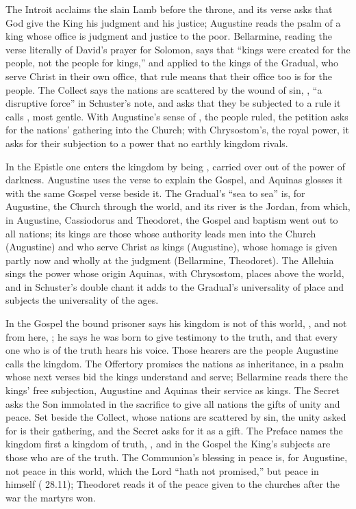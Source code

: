 The Introit acclaims the slain Lamb before the throne, and its verse asks that
God give the King his judgment and his justice; Augustine reads the psalm of a
king whose office is judgment and justice to the poor. Bellarmine, reading the
verse literally of David's prayer for Solomon, says that ``kings were created
for the people, not the people for kings,'' and applied to the kings of the
Gradual, who serve Christ in their own office, that rule means that their
office too is for the people. The Collect says the nations are scattered by
the wound of sin, , ``a disruptive force''
in Schuster's note, and asks that they be subjected to a rule it calls
, most gentle. With Augustine's sense of ,
the people ruled, the petition asks for the nations' gathering into the
Church; with Chrysostom's, the royal power, it asks for their subjection to a
power that no earthly kingdom rivals.

In the Epistle one enters the kingdom by being , carried
over out of the power of darkness. Augustine uses the verse to explain the
Gospel, and Aquinas glosses it  with the same
Gospel verse beside it. The Gradual's ``sea to sea'' is, for Augustine, the
Church through the world, and its river is the Jordan, from which, in
Augustine, Cassiodorus and Theodoret, the Gospel and baptism went out to all
nations; its kings are those whose authority leads men into the Church
(Augustine) and who serve Christ as kings (Augustine), whose homage
is given partly now and wholly at the judgment (Bellarmine, Theodoret). The Alleluia sings the power whose origin Aquinas,
with Chrysostom, places above the world, and in Schuster's double chant it
adds to the Gradual's universality of place and subjects the universality of
the ages.

In the Gospel the bound prisoner says his kingdom is not of this world,
, and not from here, ; he says he was born to
give testimony to the truth, and that every one who is of the truth hears his
voice. Those hearers are the people Augustine calls the kingdom. The Offertory
promises the nations as inheritance, in a psalm whose next verses bid the kings
understand and serve; Bellarmine reads there the kings' free subjection,
Augustine and Aquinas their service as kings. The Secret asks the Son
immolated in the sacrifice to give all nations the gifts of unity and peace.
Set beside the Collect, whose nations are scattered by sin, the unity asked
for is their gathering, and the Secret asks for it as a gift. The Preface names
the kingdom first a kingdom of truth, , and in the
Gospel the King's subjects are those who are of the truth. The Communion's blessing in peace is,
for Augustine, not peace in this world, which the Lord ``hath not promised,''
but peace in himself ( 28.11); Theodoret reads it
of the peace given to the churches after the war the martyrs won.

